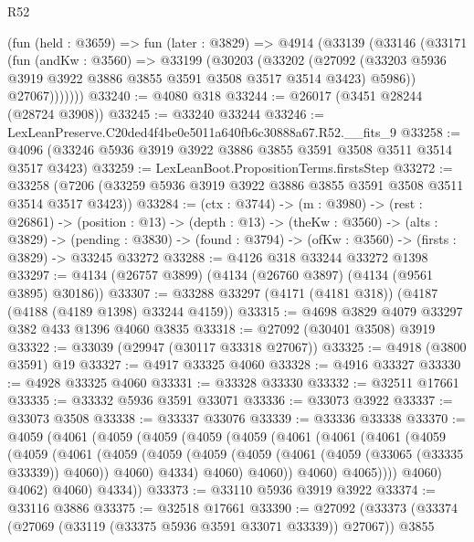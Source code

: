 \begin{lexlean}{R52}
\begin{coremodule}
      (fun (held : @3659) =>
      fun (later : @3829) =>
      @4914
        (@33139
          (@33146
            (@33171
              (fun (andKw : @3560) =>
              @33199
                (@30203
                  (@33202
                    (@27092
                      (@33203 @5936 @3919 @3922 @3886 @3855 @3591 @3508 @3517 @3514 @3423)
                      @5986))
                  @27067)))))))
@33240 := @4080 @318
@33244 := @26017 (@3451 @28244 (@28724 @3908))
@33245 := @33240 @33244
@33246 := LexLeanPreserve.C20ded4f4be0e5011a640fb6c30888a67.R52.__fits_9
@33258 := @4096 (@33246 @5936 @3919 @3922 @3886 @3855 @3591 @3508 @3511 @3514 @3517 @3423)
@33259 := LexLeanBoot.PropositionTerms.firstsStep
@33272 := @33258 (@7206 (@33259 @5936 @3919 @3922 @3886 @3855 @3591 @3508 @3511 @3514 @3517 @3423))
@33284 := (ctx : @3744) ->
  (m : @3980) ->
  (rest : @26861) ->
  (position : @13) ->
  (depth : @13) ->
  (theKw : @3560) ->
  (alts : @3829) ->
  (pending : @3830) -> (found : @3794) -> (ofKw : @3560) -> (firsts : @3829) -> @33245 @33272
@33288 := @4126 @318 @33244 @33272 @1398
@33297 := @4134 (@26757 @3899) (@4134 (@26760 @3897) (@4134 (@9561 @3895) @30186))
@33307 := @33288 @33297 (@4171 (@4181 @318)) (@4187 (@4188 (@4189 @1398) @33244 @4159))
@33315 := @4698 @3829 @4079 @33297 @382 @433 @1396 @4060 @3835
@33318 := @27092 (@30401 @3508) @3919
@33322 := @33039 (@29947 (@30117 @33318 @27067))
@33325 := @4918 (@3800 @3591) @19
@33327 := @4917 @33325 @4060
@33328 := @4916 @33327
@33330 := @4928 @33325 @4060
@33331 := @33328 @33330
@33332 := @32511 @17661
@33335 := @33332 @5936 @3591 @33071
@33336 := @33073 @3922
@33337 := @33073 @3508
@33338 := @33337 @33076
@33339 := @33336 @33338
@33370 := @4059
    (@4061
      (@4059
        (@4059
          (@4059
            (@4059
              (@4061
                (@4061
                  (@4061
                    (@4059
                      (@4059
                        (@4061
                          (@4059
                            (@4059
                              (@4059
                                (@4059 (@4061 (@4059 (@33065 (@33335 @33339)) @4060)) @4060)
                                @4334)
                              @4060)
                            @4060))
                        @4060)
                      @4065))))
              @4060)
            @4062)
          @4060)
        @4334))
@33373 := @33110 @5936 @3919 @3922
@33374 := @33116 @3886
@33375 := @32518 @17661
@33390 := @27092
    (@33373
      (@33374 (@27069 (@33119 (@33375 @5936 @3591 @33071 @33339)) @27067))
      @3855

\end{coremodule}
\end{lexlean}
